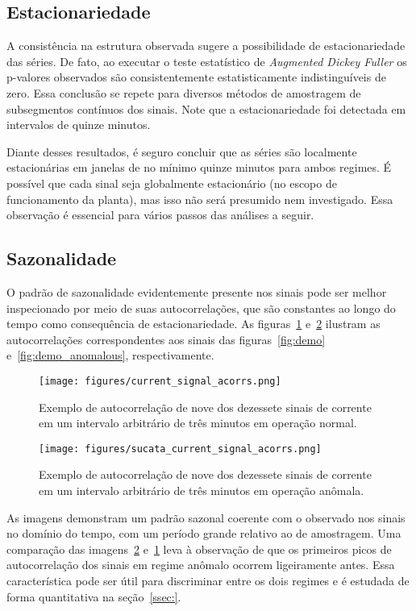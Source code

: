 \subsection{Estacionariedade}

A consistência na estrutura observada sugere a possibilidade de
estacionariedade das séries. De fato, ao executar o teste estatístico de
\emph{Augmented Dickey Fuller} os p-valores observados são consistentemente
estatisticamente indistinguíveis de zero. Essa conclusão se repete para
diversos métodos de amostragem de subsegmentos contínuos dos sinais. Note
que a estacionariedade foi detectada em intervalos de quinze minutos.

Diante desses resultados, é seguro concluir que as séries são localmente
estacionárias em janelas de no mínimo quinze minutos para ambos regimes. É
possível que cada sinal seja globalmente estacionário (no escopo de
funcionamento da planta), mas isso não será presumido nem investigado.
Essa observação é essencial para vários passos das análises a seguir.

\subsection{Sazonalidade}

O padrão de sazonalidade evidentemente presente nos sinais pode ser melhor
inspecionado por meio de suas autocorrelações, que são constantes ao longo do
tempo como consequência de estacionariedade. As figuras~\ref{fig:demo_acorrs}
e~\ref{fig:anomalous_demo_acorrs} ilustram as autocorrelações correspondentes
aos sinais das figuras~\ref{fig:demo} e~\ref{fig:demo_anomalous},
respectivamente.

\begin{figure}[H]
    \centering
    \texttt{[image: figures/current\_signal\_acorrs.png]}
    \caption{Exemplo de autocorrelação de nove dos dezessete sinais de corrente
    em um intervalo arbitrário de três minutos em operação normal.}
    \label{fig:demo_acorrs}
\end{figure}

\begin{figure}[H]
    \centering
    \texttt{[image: figures/sucata\_current\_signal\_acorrs.png]}
    \caption{Exemplo de autocorrelação de nove dos dezessete sinais de corrente
    em um intervalo arbitrário de três minutos em operação anômala.}
    \label{fig:anomalous_demo_acorrs}
\end{figure}

As imagens demonstram um padrão sazonal coerente com o observado nos sinais no
domínio do tempo, com um período grande relativo ao de amostragem. Uma
comparação das imagens~\ref{fig:anomalous_demo_acorrs} e~\ref{fig:demo_acorrs}
leva à observação de que os primeiros picos de autocorrelação dos sinais em
regime anômalo ocorrem ligeiramente antes. Essa característica pode ser útil
para discriminar entre os dois regimes e é estudada de forma quantitativa
na seção~\ref{ssec:}.


